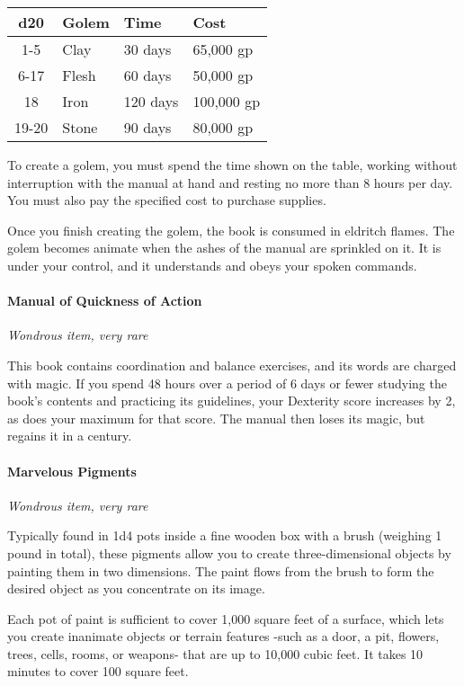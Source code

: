 \documentclass[
]{article}
\begin{document}
\begin{longtable}[]{@{}clll@{}}
\toprule
d20 & Golem & Time & Cost\tabularnewline
\midrule
\endhead
1-5 & Clay & 30 days & 65,000 gp\tabularnewline
6-17 & Flesh & 60 days & 50,000 gp\tabularnewline
18 & Iron & 120 days & 100,000 gp\tabularnewline
19-20 & Stone & 90 days & 80,000 gp\tabularnewline
\bottomrule
\end{longtable}

To create a golem, you must spend the time shown on the table, working
without interruption with the manual at hand and resting no more than 8
hours per day. You must also pay the specified cost to purchase
supplies.

Once you finish creating the golem, the book is consumed in eldritch
flames. The golem becomes animate when the ashes of the manual are
sprinkled on it. It is under your control, and it understands and obeys
your spoken commands.

\hypertarget{manual-of-quickness-of-action}{%
\paragraph{Manual of Quickness of
Action}\label{manual-of-quickness-of-action}}

\emph{Wondrous item, very rare}

This book contains coordination and balance exercises, and its words are
charged with magic. If you spend 48 hours over a period of 6 days or
fewer studying the book's contents and practicing its guidelines, your
Dexterity score increases by 2, as does your maximum for that score. The
manual then loses its magic, but regains it in a century.

\hypertarget{marvelous-pigments}{%
\paragraph{Marvelous Pigments}\label{marvelous-pigments}}

\emph{Wondrous item, very rare}

Typically found in 1d4 pots inside a fine wooden box with a brush
(weighing 1 pound in total), these pigments allow you to create
three-dimensional objects by painting them in two dimensions. The paint
flows from the brush to form the desired object as you concentrate on
its image.

Each pot of paint is sufficient to cover 1,000 square feet of a surface,
which lets you create inanimate objects or terrain features -such as a
door, a pit, flowers, trees, cells, rooms, or weapons- that are up to
10,000 cubic feet. It takes 10 minutes to cover 100 square feet.
\end{document}
